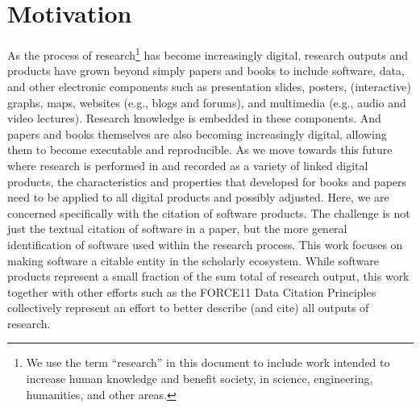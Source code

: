 \documentclass[12pt, oneside]{amsart}
\begin{document}
\section{Motivation}
\label{sec:intro}

As the process of research\footnote{We use the term ``research'' in this document to include work intended to increase human knowledge and benefit society, in science, engineering, humanities, and other areas.} has become increasingly digital, research outputs
and products have grown beyond simply papers and books to include software,
data, and other electronic components such as presentation slides, posters,
(interactive) graphs, maps, websites (e.g., blogs and forums), and multimedia
(e.g., audio and  video lectures).  Research knowledge is embedded in these
components. And papers and books themselves are also becoming increasingly
digital, allowing them to become executable and reproducible. As we move towards
this future where research is performed in and recorded as a variety of linked
digital products, the characteristics and properties that developed for books
and papers need to be applied to all digital products and possibly adjusted.
Here, we are concerned specifically with the citation of software products. The
challenge is not just the textual citation of software in a paper, but the more
general identification of software used within the research process. This work
focuses on making software a citable entity in the scholarly ecosystem. While
software products represent a small fraction of the sum total of
research output, this work together with other efforts such as the FORCE11
Data Citation Principles~\cite{data-citation-principles,10.7717/peerj-cs.1}
collectively represent an effort to better describe (and cite) all outputs of
research.
\end{document}
